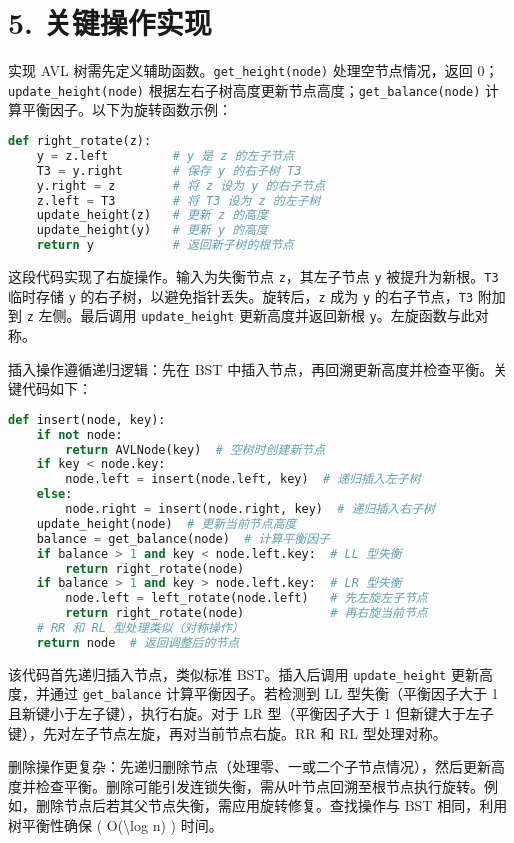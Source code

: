\chapter{5. 关键操作实现}
实现 AVL 树需先定义辅助函数。\texttt{get\_{}height(node)} 处理空节点情况，返回 0；\texttt{update\_{}height(node)} 根据左右子树高度更新节点高度；\texttt{get\_{}balance(node)} 计算平衡因子。以下为旋转函数示例：\par
\begin{lstlisting}[language=python]
def right_rotate(z):
    y = z.left         # y 是 z 的左子节点
    T3 = y.right       # 保存 y 的右子树 T3
    y.right = z        # 将 z 设为 y 的右子节点
    z.left = T3        # 将 T3 设为 z 的左子树
    update_height(z)   # 更新 z 的高度
    update_height(y)   # 更新 y 的高度
    return y           # 返回新子树的根节点
\end{lstlisting}
这段代码实现了右旋操作。输入为失衡节点 \texttt{z}，其左子节点 \texttt{y} 被提升为新根。\texttt{T3} 临时存储 \texttt{y} 的右子树，以避免指针丢失。旋转后，\texttt{z} 成为 \texttt{y} 的右子节点，\texttt{T3} 附加到 \texttt{z} 左侧。最后调用 \texttt{update\_{}height} 更新高度并返回新根 \texttt{y}。左旋函数与此对称。\par
插入操作遵循递归逻辑：先在 BST 中插入节点，再回溯更新高度并检查平衡。关键代码如下：\par
\begin{lstlisting}[language=python]
def insert(node, key):
    if not node: 
        return AVLNode(key)  # 空树时创建新节点
    if key < node.key:
        node.left = insert(node.left, key)  # 递归插入左子树
    else:
        node.right = insert(node.right, key)  # 递归插入右子树
    update_height(node)  # 更新当前节点高度
    balance = get_balance(node)  # 计算平衡因子
    if balance > 1 and key < node.left.key:  # LL 型失衡
        return right_rotate(node)
    if balance > 1 and key > node.left.key:  # LR 型失衡
        node.left = left_rotate(node.left)   # 先左旋左子节点
        return right_rotate(node)            # 再右旋当前节点
    # RR 和 RL 型处理类似（对称操作）
    return node  # 返回调整后的节点
\end{lstlisting}
该代码首先递归插入节点，类似标准 BST。插入后调用 \texttt{update\_{}height} 更新高度，并通过 \texttt{get\_{}balance} 计算平衡因子。若检测到 LL 型失衡（平衡因子大于 1 且新键小于左子键），执行右旋。对于 LR 型（平衡因子大于 1 但新键大于左子键），先对左子节点左旋，再对当前节点右旋。RR 和 RL 型处理对称。\par
删除操作更复杂：先递归删除节点（处理零、一或二个子节点情况），然后更新高度并检查平衡。删除可能引发连锁失衡，需从叶节点回溯至根节点执行旋转。例如，删除节点后若其父节点失衡，需应用旋转修复。查找操作与 BST 相同，利用树平衡性确保 ( O(\textbackslash{}log n) ) 时间。\par
